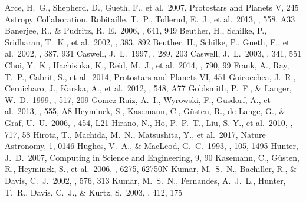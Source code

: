 \documentclass[twocolumn]{aastex62}
\begin{document}
\begin{CJK*}{UTF8}{gbsn}
\begin{thebibliography}{}
 Arce, H.~G., Shepherd, D., Gueth, F., et al.\ 2007, Protostars and Planets V, 245 
 Astropy Collaboration, Robitaille, T.~P., Tollerud, E.~J., et al.\ 2013, \aap, 558, A33 
 Banerjee, R., \& Pudritz, R.~E.\ 2006, \apj, 641, 949 
 Beuther, H., Schilke, P., Sridharan, T.~K., et al.\ 2002, \aap, 383, 892
 Beuther, H., Schilke, P., Gueth, F., et al.\ 2002, \aap, 387, 931 
 Caswell, J.~L.\ 1997, \mnras, 289, 203 
 Caswell, J.~L.\ 2003, \mnras, 341, 551 
 Choi, Y.~K., Hachisuka, K., Reid, M.~J., et al.\ 2014, \apj, 790, 99 
 Frank, A., Ray, T.~P., Cabrit, S., et al.\ 2014, Protostars and Planets VI, 451
 Goicoechea, J.~R., Cernicharo, J., Karska, A., et al.\ 2012, \aap, 548, A77 
 Goldsmith, P.~F., \& Langer, W.~D.\ 1999, \apj, 517, 209
 Gomez-Ruiz, A.~I., Wyrowski, F., Gusdorf, A., et al.\ 2013, \aap, 555, A8
 Heyminck, S., Kasemann, C., G{\"u}sten, R., de Lange, G., \& Graf, U.~U.\ 2006, \aap, 454, L21 
 Hirano, N., Ho, P.~P.~T., Liu, S.-Y., et al.\ 2010, \apj, 717, 58
 Hirota, T., Machida, M.~N., Matsushita, Y., et al.\ 2017, Nature Astronomy, 1, 0146
 Hughes, V.~A., \& MacLeod, G.~C.\ 1993, \aj, 105, 1495
 Hunter, J.~D.\ 2007, Computing in Science and Engineering, 9, 90 
 Kasemann, C., G{\"u}sten, R., Heyminck, S., et al.\ 2006, \procspie, 6275, 62750N 
 Kumar, M.~S.~N., Bachiller, R., \& Davis, C.~J.\ 2002, \apj, 576, 313 
 Kumar, M.~S.~N., Fernandes, A.~J.~L., Hunter, T.~R., Davis, C.~J., \& Kurtz, S.\ 2003, \aap, 412, 175 

\end{thebibliography}
\end{CJK*}
\end{document}
